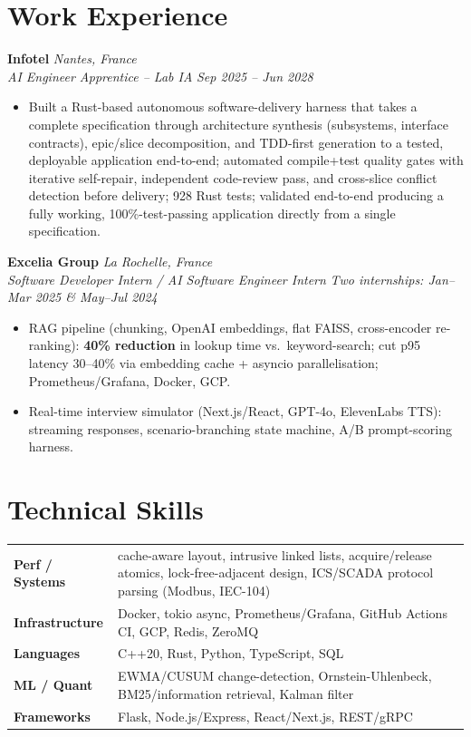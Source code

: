 \documentclass[10pt]{article}
\newcommand{\entry}[4]{%
  \noindent\textbf{#1} \hfill \textit{#2} \\
  \textit{#3} \hfill \textit{#4}\\[-0.3em]
}
\begin{document}
\section*{Work Experience}
\entry{Infotel}{Nantes, France}{AI Engineer Apprentice -- Lab IA}{Sep 2025 -- Jun 2028}
\begin{itemize}
  \item Built a Rust-based autonomous software-delivery harness that takes a complete specification through architecture synthesis (subsystems, interface contracts), epic/slice decomposition, and TDD-first generation to a tested, deployable application end-to-end; automated compile+test quality gates with iterative self-repair, independent code-review pass, and cross-slice conflict detection before delivery; 928 Rust tests; validated end-to-end producing a fully working, 100\%-test-passing application directly from a single specification.
\end{itemize}
\entry{Excelia Group}{La Rochelle, France}{Software Developer Intern / AI Software Engineer Intern}{Two internships: Jan--Mar 2025 \& May--Jul 2024}
\begin{itemize}
  \item RAG pipeline (chunking, OpenAI embeddings, flat FAISS, cross-encoder re-ranking): \textbf{40\% reduction} in lookup time vs.\ keyword-search; cut p95 latency 30--40\% via embedding cache + asyncio parallelisation; Prometheus/Grafana, Docker, GCP.
  \item Real-time interview simulator (Next.js/React, GPT-4o, ElevenLabs TTS): streaming responses, scenario-branching state machine, A/B prompt-scoring harness.
\end{itemize}

\section*{Technical Skills}
\noindent
\begin{tabular}{@{}p{2.7cm}p{15.5cm}@{}}
\textbf{Perf / Systems} & cache-aware layout, intrusive linked lists, acquire/release atomics, lock-free-adjacent design, ICS/SCADA protocol parsing (Modbus, IEC-104) \\
\textbf{Infrastructure} & Docker, tokio async, Prometheus/Grafana, GitHub Actions CI, GCP, Redis, ZeroMQ \\
\textbf{Languages} & C++20, Rust, Python, TypeScript, SQL \\
\textbf{ML / Quant} & EWMA/CUSUM change-detection, Ornstein-Uhlenbeck, BM25/information retrieval, Kalman filter \\
\textbf{Frameworks} & Flask, Node.js/Express, React/Next.js, REST/gRPC \\
\end{tabular}
\end{document}

